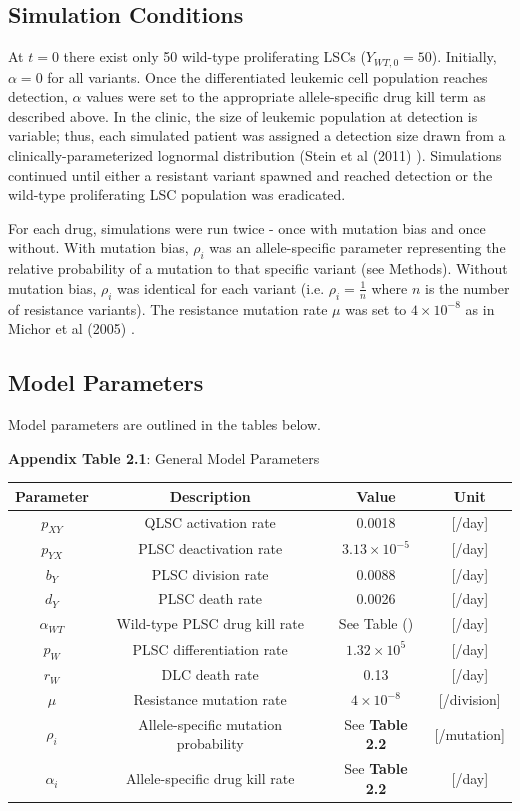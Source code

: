 \documentclass{article}
\begin{document}
\subsection{Simulation Conditions}
At $t=0$ there exist only 50 wild-type proliferating LSCs ($Y_{WT,0} = 50$).  Initially, $\alpha = 0$ for all variants.  Once the differentiated leukemic cell population reaches detection, $\alpha$ values were set to the appropriate allele-specific drug kill term as described above.  In the clinic, the size of leukemic population at detection is variable; thus, each simulated patient was assigned a detection size drawn from a clinically-parameterized lognormal distribution (Stein et al (2011) \cite{8}).  Simulations continued until either a resistant variant spawned and reached detection or the wild-type proliferating LSC population was eradicated.

For each drug, simulations were run twice - once with mutation bias and once without.  With mutation bias, $\rho_i$ was an allele-specific parameter representing the relative probability of a mutation to that specific variant (see Methods).  Without mutation bias, $\rho_i$ was identical for each variant (i.e. $\rho_i = \frac{1}{n}$ where $n$ is the number of resistance variants).  The resistance mutation rate $\mu$ was set to $4 \times 10^{-8}$ as in Michor et al (2005) \cite{9}.

\subsection{Model Parameters}
Model parameters are outlined in the tables below.
\begin{center}
\textbf{Appendix Table 2.1}: General Model Parameters
 \begin{tabular}{||c || c | c | c ||} 
 \hline
  \textbf{Parameter} & \textbf{Description} & \textbf{Value} & \textbf{Unit} \\ [0.5ex] 
 \hline\hline
 $p_{XY}$ & QLSC activation rate  & 0.0018 & [/day] \\ 
 \hline
 $p_{YX}$ & PLSC deactivation rate & $3.13 \times 10^{-5}$ & [/day] \\
 \hline
 $b_Y$ & PLSC division rate & 0.0088 & [/day] \\
 \hline
 $d_Y$ & PLSC death rate & 0.0026 & [/day] \\
 \hline
 $\alpha_{WT}$ & Wild-type PLSC drug kill rate & See Table () & [/day] \\
 \hline
 $p_W$ & PLSC differentiation rate & $1.32 \times 10^5$ & [/day] \\
 \hline
 $r_W$ & DLC death rate & 0.13 & [/day] \\
 \hline
 $\mu$ & Resistance mutation rate & $4 \times 10^{-8}$ & [/division] \\
 \hline
 $\rho_i$ & Allele-specific mutation probability & See \textbf{Table 2.2} & [/mutation] \\
 \hline
 $\alpha_i$ & Allele-specific drug kill rate & See \textbf{Table 2.2} & [/day] \\
 \hline
\end{tabular}
\end{center}
\end{document}
